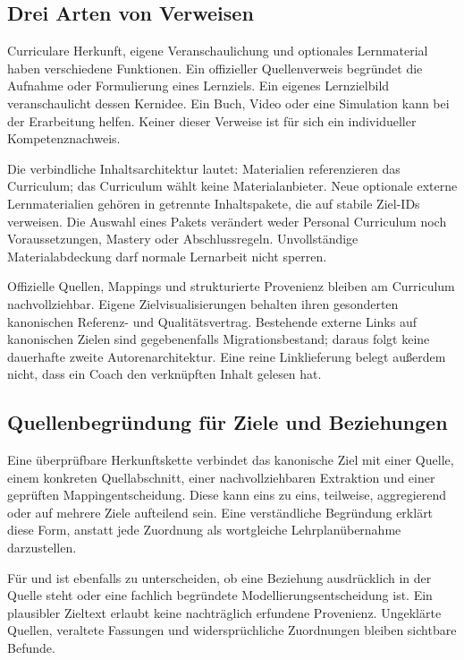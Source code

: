 \subsection{Drei Arten von Verweisen}

Curriculare Herkunft, eigene Veranschaulichung und optionales
Lernmaterial haben verschiedene Funktionen. Ein offizieller
Quellenverweis begründet die Aufnahme oder Formulierung eines
Lernziels. Ein eigenes Lernzielbild veranschaulicht dessen Kernidee.
Ein Buch, Video oder eine Simulation kann bei der Erarbeitung
helfen. Keiner dieser Verweise ist für sich ein individueller
Kompetenznachweis.

Die verbindliche Inhaltsarchitektur lautet: Materialien
referenzieren das Curriculum; das Curriculum wählt keine
Materialanbieter. Neue optionale externe Lernmaterialien gehören
in getrennte Inhaltspakete, die auf stabile Ziel-IDs verweisen.
Die Auswahl eines Pakets verändert weder Personal Curriculum
noch Voraussetzungen, Mastery oder Abschlussregeln. Unvollständige
Materialabdeckung darf normale Lernarbeit nicht sperren.

Offizielle Quellen, Mappings und strukturierte Provenienz bleiben
am Curriculum nachvollziehbar. Eigene Zielvisualisierungen behalten
ihren gesonderten kanonischen Referenz- und Qualitätsvertrag.
Bestehende externe Links auf kanonischen Zielen sind gegebenenfalls
Migrationsbestand; daraus folgt keine dauerhafte zweite
Autorenarchitektur. Eine reine Linklieferung belegt außerdem
nicht, dass ein Coach den verknüpften Inhalt gelesen hat.

\subsection{Quellenbegründung für Ziele und Beziehungen}

Eine überprüfbare Herkunftskette verbindet das kanonische Ziel mit
einer Quelle, einem konkreten Quellabschnitt, einer nachvollziehbaren
Extraktion und einer geprüften Mappingentscheidung. Diese kann
eins zu eins, teilweise, aggregierend oder auf mehrere Ziele
aufteilend sein. Eine verständliche Begründung erklärt diese Form,
anstatt jede Zuordnung als wortgleiche Lehrplanübernahme darzustellen.

Für  und  ist ebenfalls zu
unterscheiden, ob eine Beziehung ausdrücklich in der Quelle steht
oder eine fachlich begründete Modellierungsentscheidung ist.
Ein plausibler Zieltext erlaubt keine nachträglich erfundene
Provenienz. Ungeklärte Quellen, veraltete Fassungen und
widersprüchliche Zuordnungen bleiben sichtbare Befunde.

